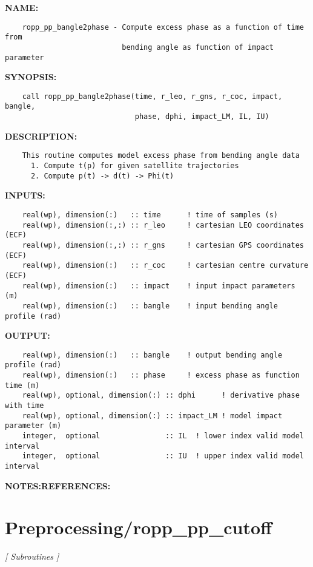 \label{ch:robo71}
\label{ch:Preprocessing_ropp_pp_bangle2phase}
\textbf{NAME:}\hspace{0.08in}\begin{Verbatim}
    ropp_pp_bangle2phase - Compute excess phase as a function of time from 
                           bending angle as function of impact parameter
\end{Verbatim}
\textbf{SYNOPSIS:}\hspace{0.08in}\begin{Verbatim}
    call ropp_pp_bangle2phase(time, r_leo, r_gns, r_coc, impact, bangle, 
                              phase, dphi, impact_LM, IL, IU)
\end{Verbatim}
\textbf{DESCRIPTION:}\hspace{0.08in}\begin{Verbatim}
    This routine computes model excess phase from bending angle data
      1. Compute t(p) for given satellite trajectories
      2. Compute p(t) -> d(t) -> Phi(t)
\end{Verbatim}
\textbf{INPUTS:}\hspace{0.08in}\begin{Verbatim}
    real(wp), dimension(:)   :: time      ! time of samples (s)
    real(wp), dimension(:,:) :: r_leo     ! cartesian LEO coordinates (ECF)
    real(wp), dimension(:,:) :: r_gns     ! cartesian GPS coordinates (ECF)
    real(wp), dimension(:)   :: r_coc     ! cartesian centre curvature (ECF)
    real(wp), dimension(:)   :: impact    ! input impact parameters (m)
    real(wp), dimension(:)   :: bangle    ! input bending angle profile (rad)
\end{Verbatim}
\textbf{OUTPUT:}\hspace{0.08in}\begin{Verbatim}
    real(wp), dimension(:)   :: bangle    ! output bending angle profile (rad)
    real(wp), dimension(:)   :: phase     ! excess phase as function time (m)
    real(wp), optional, dimension(:) :: dphi      ! derivative phase with time
    real(wp), optional, dimension(:) :: impact_LM ! model impact parameter (m)
    integer,  optional               :: IL  ! lower index valid model interval
    integer,  optional               :: IU  ! upper index valid model interval
\end{Verbatim}
\textbf{NOTES:}\hspace{0.08in}\textbf{REFERENCES:}\hspace{0.08in}\section{Preprocessing/ropp\_pp\_cutoff}
\textsl{[ Subroutines ]}

